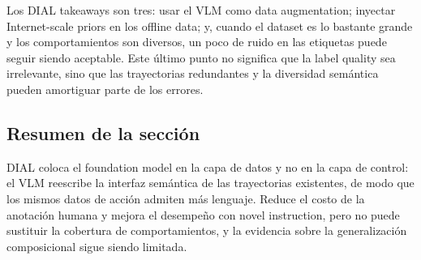 Los DIAL takeaways son tres: usar el VLM como data augmentation; inyectar Internet-scale priors en los offline data; y, cuando el dataset es lo bastante grande y los comportamientos son diversos, un poco de ruido en las etiquetas puede seguir siendo aceptable. Este último punto no significa que la label quality sea irrelevante, sino que las trayectorias redundantes y la diversidad semántica pueden amortiguar parte de los errores.



\subsection{Resumen de la sección}

DIAL coloca el foundation model en la capa de datos y no en la capa de control: el VLM reescribe la interfaz semántica de las trayectorias existentes, de modo que los mismos datos de acción admiten más lenguaje. Reduce el costo de la anotación humana y mejora el desempeño con novel instruction, pero no puede sustituir la cobertura de comportamientos, y la evidencia sobre la generalización composicional sigue siendo limitada.
